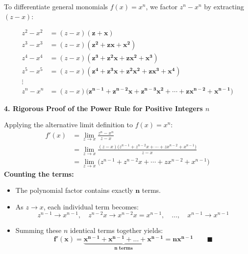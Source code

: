 \documentclass[10.5pt]{article}
\begin{document}
To differentiate general monomials $f(x) = x^n$, we factor $z^n - x^n$ by extracting $(z - x)$:
\begin{tcolorbox}[colback=chalkblue!6, colframe=chalkblue, boxrule=1pt, arc=3pt, left=8pt, right=8pt, top=4pt, bottom=4pt]
\begin{align*}
  z^2 - x^2 &= (z-x)\mathbf{(z + x)} \\
  z^3 - x^3 &= (z-x)\mathbf{(z^2 + zx + x^2)} \\
  z^4 - x^4 &= (z-x)\mathbf{(z^3 + z^2x + zx^2 + x^3)} \\
  z^5 - x^5 &= (z-x)\mathbf{(z^4 + z^3x + z^2x^2 + zx^3 + x^4)} \\
  \vdots & \\
  z^n - x^n &= (z-x)\mathbf{\big(z^{n-1} + z^{n-2}x + z^{n-3}x^2 + \cdots + zx^{n-2} + x^{n-1}\big)}
\end{align*}
\end{tcolorbox}

\vspace{0.04in}

\textbf{\large 4. Rigorous Proof of the Power Rule for Positive Integers $n$}

Applying the alternative limit definition to $f(x) = x^n$:
\begin{align*}
  f'(x) &= \lim_{z\to x} \frac{z^n - x^n}{z - x} \\
        &= \lim_{z\to x} \frac{(z-x)\big(z^{n-1} + z^{n-2}x + \cdots + zx^{n-2} + x^{n-1}\big)}{z-x} \\
        &= \lim_{z\to x} \big(z^{n-1} + z^{n-2}x + \cdots + zx^{n-2} + x^{n-1}\big)
\end{align*}
\textbf{Counting the terms:}
\begin{itemize}[leftmargin=1.2em, topsep=1pt, itemsep=3pt]
  \item The polynomial factor contains exactly $\mathbf{n}$ terms.
  \item As $z \to x$, each individual term becomes:
  \[
    z^{n-1} \to x^{n-1}, \quad z^{n-2}x \to x^{n-2}x = x^{n-1}, \quad \dots, \quad x^{n-1} \to x^{n-1}
  \]
  \item Summing these $n$ identical terms together yields:
  \[
    \mathbf{f'(x) = \underbrace{x^{n-1} + x^{n-1} + \dots + x^{n-1}}_{n \text{ terms}} = n x^{n-1}} \qquad \blacksquare
  \]
\end{itemize}
\end{document}
